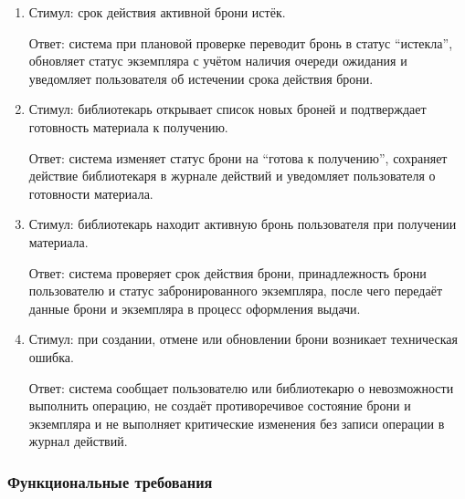 \documentclass[12pt,a4paper]{article}
\begin{document}
\begin{enumerate}
		\item Стимул: срок действия активной брони истёк.
		
		Ответ: система при плановой проверке переводит бронь в статус ``истекла'',
		обновляет статус экземпляра с учётом наличия очереди ожидания и уведомляет
		пользователя об истечении срока действия брони.
		
		\item Стимул: библиотекарь открывает список новых броней и подтверждает
		готовность материала к получению.
		
		Ответ: система изменяет статус брони на ``готова к получению'', сохраняет
		действие библиотекаря в журнале действий и уведомляет пользователя о готовности
		материала.
		
		\item Стимул: библиотекарь находит активную бронь пользователя при получении
		материала.
		
		Ответ: система проверяет срок действия брони, принадлежность брони
		пользователю и статус забронированного экземпляра, после чего передаёт данные
		брони и экземпляра в процесс оформления выдачи.
		
		\item Стимул: при создании, отмене или обновлении брони возникает техническая
		ошибка.
		
		Ответ: система сообщает пользователю или библиотекарю о невозможности
		выполнить операцию, не создаёт противоречивое состояние брони и экземпляра
		и не выполняет критические изменения без записи операции в журнал действий.
	\end{enumerate}
	
	\subsubsection{Функциональные требования}
	
\end{document}
